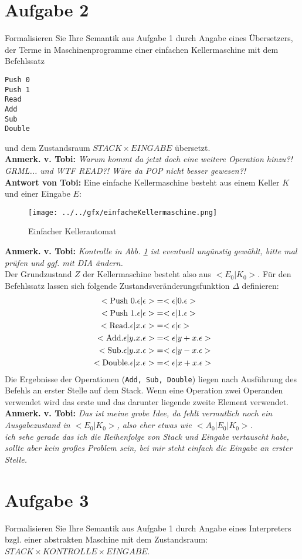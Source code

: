 \documentclass[ngerman,a4paper]{report}
\begin{document}
\section*{Aufgabe 2}
Formalisieren Sie Ihre Semantik aus Aufgabe 1 durch Angabe eines Übersetzers, der Terme in Maschinenprogramme einer einfachen Kellermaschine mit dem Befehlssatz
\begin{lstlisting}
Push 0
Push 1
Read
Add
Sub
Double
\end{lstlisting}
und dem Zustandsraum $STACK \times EINGABE$ übersetzt.\\
\textbf{Anmerk. v. Tobi:} \emph{Warum kommt da jetzt doch eine weitere Operation hinzu?! GRML... und WTF READ?! Wäre da POP nicht besser gewesen?!}\\
\textbf{Antwort von Tobi:} Eine einfache Kellermaschine besteht aus einem Keller $K$ und einer Eingabe $E$:\\
\begin{figure}[h]
	\centering
	\texttt{[image: ../../gfx/einfacheKellermaschine.png]}
	\caption{Einfacher Kellerautomat}\label{gfx:ekeller}
\end{figure}
\textbf{Anmerk. v. Tobi:} \emph{Kontrolle in Abb. \ref{gfx:ekeller} ist eventuell ungünstig gewählt, bitte mal prüfen und ggf. mit DIA ändern.}\\
Der Grundzustand $Z$ der Kellermaschine besteht also aus $<E_0|K_0>$. Für den Befehlssatz lassen sich folgende Zustandsveränderungsfunktion $\Delta$ definieren:
\begin{align*}
<\text{\lstinline!Push 0!}.\epsilon|\epsilon> &= <\epsilon|0.\epsilon>\\
<\text{\lstinline!Push 1!}.\epsilon|\epsilon> &= <\epsilon|1.\epsilon>\\
<\text{\lstinline!Read!}.\epsilon|x.\epsilon> &= <\epsilon|\epsilon>\\
<\text{\lstinline!Add!}.\epsilon|y.x.\epsilon> &= <\epsilon|y+x.\epsilon>\\
<\text{\lstinline!Sub!}.\epsilon|y.x.\epsilon> &= <\epsilon|y-x.\epsilon>\\
<\text{\lstinline!Double!}.\epsilon|x.\epsilon> &= <\epsilon|x+x.\epsilon>\\
\end{align*}
Die Ergebnisse der Operationen (\lstinline!Add, Sub, Double!) liegen nach Ausführung des Befehls an erster Stelle auf dem Stack. Wenn eine Operation zwei Operanden verwendet wird das erste und das darunter liegende zweite Element verwendet.\\
\textbf{Anmerk. v. Tobi:} \emph{Das ist meine grobe Idee, da fehlt vermutlich noch ein Ausgabezustand in $<E_0|K_0>$, also eher etwas wie $<A_0|E_0|K_0>$.\\ ich sehe gerade das ich die Reihenfolge von Stack und Eingabe vertauscht habe, sollte aber kein großes Problem sein, bei mir steht einfach die Eingabe an erster Stelle.}\\
\section*{Aufgabe 3}
Formalisieren Sie Ihre Semantik aus Aufgabe 1 durch Angabe eines Interpreters bzgl. einer abstrakten Maschine mit dem Zustandsraum: $STACK \times KONTROLLE \times EINGABE$.\\
\end{document}
